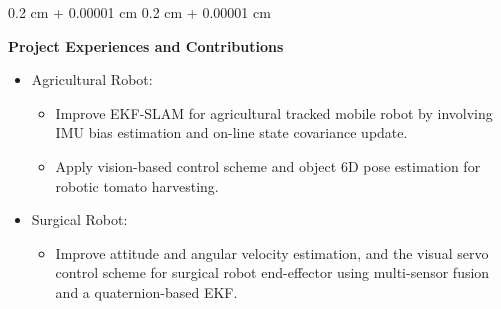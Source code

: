 \documentclass[10pt, letterpaper]{article}
\newenvironment{highlights}{
    \begin{itemize}[
        topsep=0.10 cm,
        parsep=0.10 cm,
        partopsep=0pt,
        itemsep=0pt,
        leftmargin=0.4 cm + 10pt
    ]
}{
    \end{itemize}
} %
\newenvironment{onecolentry}{
    \begin{adjustwidth}{
        0.2 cm + 0.00001 cm
    }{
        0.2 cm + 0.00001 cm
    }
}{
    \end{adjustwidth}
} %
\newenvironment{twocolentry}[2][]{
    \onecolentry
    \def\secondColumn{#2}
    \setcolumnwidth{\fill, 4.5 cm}
    \begin{paracol}{2}
}{
    \switchcolumn \raggedleft \secondColumn
    \end{paracol}
    \endonecolentry
} %
\let\hrefWithoutArrow\href
\renewcommand{\href}[2]{\hrefWithoutArrow{#1}{\ifthenelse{\equal{#2}{}}{ }{#2 }\raisebox{.15ex}{\footnotesize \faExternalLink*}}}
\begin{document}
        \vspace{0.10 cm}
        \begin{onecolentry}
        \textbf{Project Experiences and Contributions}
            \begin{highlights}
                \item Agricultural Robot:
                \begin{itemize}
                    \item Improve EKF-SLAM for agricultural tracked mobile robot by involving IMU bias estimation and on-line state covariance update.
                    \item Apply vision-based control scheme and object 6D pose estimation for robotic tomato harvesting.
                \end{itemize}
                \item Surgical Robot:
                \begin{itemize}
                    \item Improve attitude and angular velocity estimation, and the visual servo control scheme for surgical robot end-effector using multi-sensor fusion and a quaternion-based EKF.
                \end{itemize}
            \end{highlights}
        \end{onecolentry}








\end{document}
